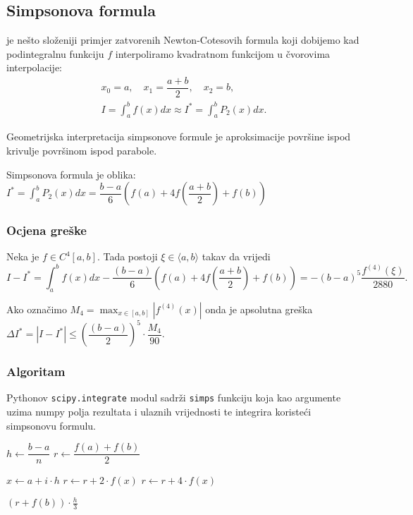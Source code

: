 \subsection{Simpsonova formula}

 je nešto složeniji primjer zatvorenih Newton-Cotesovih
formula koji dobijemo kad podintegralnu funkciju $f$ interpoliramo kvadratnom
funkcijom u čvorovima interpolacije:
\begin{gather*}
    x_0 = a,\quad x_1=\dfrac{a+b}{2},\quad x_2 = b,\\
    I = \int_a^b f(x)dx \approx I^* = \int_a^b P_2(x)dx.
\end{gather*}

Geometrijska interpretacija simpsonove formule je aproksimacije površine ispod krivulje površinom ispod parabole.

Simpsonova formula je oblika: $\displaystyle
I^* = \int_a^b P_2(x)dx = \dfrac{b-a}{6}\left(f(a) + 4f\left(\dfrac{a+b}{2}\right) + f(b)\right)
$

\subsubsection{Ocjena greške}

Neka je $f\in C^4[a,b]$. Tada postoji $\xi \in \langle a,b\rangle$ takav da vrijedi
$$
I - I^* = \int_a^b f(x) dx - \dfrac{(b-a)}{6}\left(f(a) + 4f\left(\dfrac{a+b}{2}\right) + f(b)\right) = -(b-a)^5\dfrac{f^{(4)}(\xi)}{2880}.
$$

Ako označimo $\displaystyle M_4 = \max_{x\in[a,b]}|f^{(4)}(x)|$ onda je apsolutna
greška $\displaystyle \Delta I^* = |I - I^*| \leq \left(\dfrac{(b-a)}{2}\right)^5 \cdot \dfrac{M_4}{90}.$


\subsubsection{Algoritam}

Pythonov \verb|scipy.integrate| modul sadrži \verb|simps| funkciju koja kao
argumente uzima numpy polja rezultata i ulaznih vrijednosti te integrira
koristeći simpsonovu formulu.

\begin{algorithmic}
    \State $h \gets \dfrac{b - a}{n}$
    \State $r \gets \dfrac{f(a) + f(b)}{2}$

        \State $x \gets a + i \cdot h$
            \State $r \gets r + 2 \cdot f(x)$
        \Else
            \State $r \gets r + 4 \cdot f(x)$
        \EndIf
    \EndFor

    \State \Return $(r + f(b)) \cdot \frac{h}{3}$
\EndFunction
\end{algorithmic}
